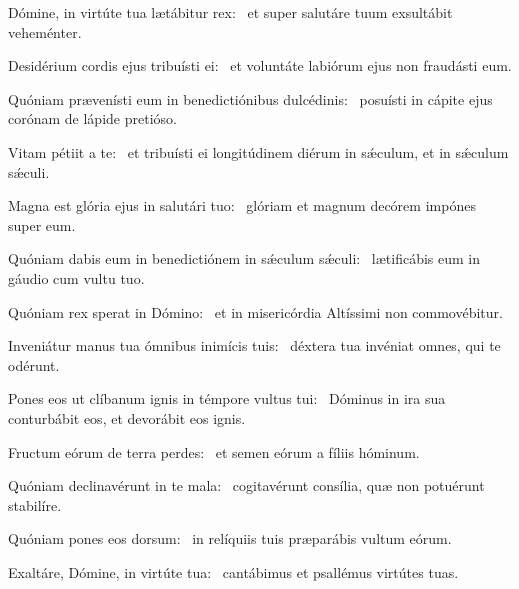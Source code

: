 \item Dómine, in virtúte tua lætábitur rex:~\psstar{} et super salutáre tuum exsultábit veheménter.

\item Desidérium cordis ejus tribuísti ei:~\psstar{} et voluntáte labiórum ejus non fraudásti eum.

\item Quóniam prævenísti eum in benedictiónibus dulcédinis:~\psstar{} posuísti in cápite ejus corónam de lápide pretióso.

\item Vitam pétiit a te:~\psstar{} et tribuísti ei longitúdinem diérum in sǽculum, et in sǽculum sǽculi.

\item Magna est glória ejus in salutári tuo:~\psstar{} glóriam et magnum decórem impónes super eum.

\item Quóniam dabis eum in benedictiónem in sǽculum sǽculi:~\psstar{} lætificábis eum in gáudio cum vultu tuo.

\item Quóniam rex sperat in Dómino:~\psstar{} et in misericórdia Altíssimi non commovébitur.

\item Inveniátur manus tua ómnibus inimícis tuis:~\psstar{} déxtera tua invéniat omnes, qui te odérunt.

\item Pones eos ut clíbanum ignis in témpore vultus tui:~\psstar{} Dóminus in ira sua conturbábit eos, et devorábit eos ignis.

\item Fructum eórum de terra perdes:~\psstar{} et semen eórum a fíliis hóminum.

\item Quóniam declinavérunt in te mala:~\psstar{} cogitavérunt consília, quæ non potuérunt stabilíre.

\item Quóniam pones eos dorsum:~\psstar{} in relíquiis tuis præparábis vultum eórum.

\item Exaltáre, Dómine, in virtúte tua:~\psstar{} cantábimus et psallémus virtútes tuas.

